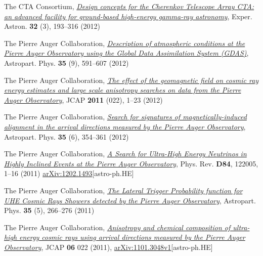 \begin{etaremune}
\item {}The CTA Consortium,
\href{http://dx.doi.org/10.1007/s10686-011-9247-0}{\emph{Design concepts for
the Cherenkov Telescope Array CTA: an advanced facility for ground-based
high-energy gamma-ray astronomy}}, Exper. Astron. {\bf{32}} (3), 193--316
(2012)

\item {}The Pierre Auger Collaboration, 
\href{http://dx.doi.org/10.1016/j.astropartphys.2011.12.002}{\emph{Description
of atmospheric conditions at the Pierre Auger Observatory using the Global Data
Assimilation System (GDAS)}}, Astropart. Phys. {\bf{35}} (9), 591--607 (2012)

\item {}The Pierre Auger Collaboration, 
\href{http://dx.doi.org/10.1088/1475-7516/2011/11/022}{\emph{The effect of the
geomagnetic field on cosmic ray energy estimates and large scale anisotropy
searches on data from the Pierre Auger Observatory}}, JCAP {\bf{2011}} (022),
1--23 (2012)

\item {}The Pierre Auger Collaboration, 
\href{http://dx.doi.org/10.1016/j.astropartphys.2011.10.004}{\emph{Search for
signatures of magnetically-induced alignment in the arrival directions measured
by the Pierre Auger Observatory}}, Astropart. Phys. {\bf{35}} (6), 354--361
(2012)

\item {}The Pierre Auger Collaboration,
\href{http://dx.doi.org/10.1016/10.1103/PhysRevD.84.122005}{\emph{A Search for
Ultra-High Energy Neutrinos in Highly Inclined Events at the Pierre Auger
Observatory}}, Phys.  Rev. {\bf D84}, 122005, 1--16 (2011)
\href{http://arxiv.org/abs/1202.1493}{arXiv:1202.1493}[astro-ph.HE]

\item {}The Pierre Auger Collaboration, 
\href{http://dx.doi.org/10.1016/j.astropartphys.2011.08.001}{\emph{The Lateral
Trigger Probability function for UHE Cosmic Rays Showers detected by the Pierre
Auger Observatory}}, Astropart. Phys. {\bf{35}} (5), 266--276 (2011)

\item {}The Pierre Auger Collaboration,
\href{http://dx.doi.org/10.1088/1475-7516/2011/06/022}{\emph{Anisotropy and
chemical composition of ultra-high energy cosmic rays using arrival directions
measured by the Pierre Auger Observatory}}, JCAP {\bf 06} 022 (2011),
\href{http://arxiv.org/abs/1106.3048}{arXiv:1101.3048v1}[astro-ph.HE]


\end{etaremune}
